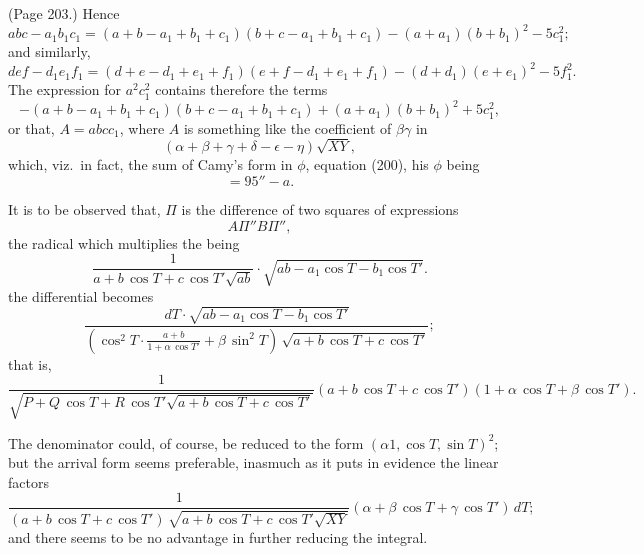 \documentclass[11pt,a4paper]{book}
\begin{document}
\medskip

\noindent (Page 203.) Hence
\[
abc - a_1 b_1 c_1 = (a + b - a_1 + b_1 + c_1) (b + c - a_1 + b_1 + c_1) - (a + a_1) (b + b_1)^2 - 5 c_1^2;
\]
and similarly,
\[
def - d_1 e_1 f_1 = (d + e - d_1 + e_1 + f_1)(e + f - d_1 + e_1 + f_1) - (d + d_1)(e + e_1)^2 - 5 f_1^2.
\]
The expression for $a^2 c_1^2$ contains therefore the terms
\[
- (a + b - a_1 + b_1 + c_1)(b + c - a_1 + b_1 + c_1) + (a + a_1) ( b + b_1)^2 + 5 c_1^2,
\]
or that, $A = a b c c_1$, where $A$ is something like the coefficient of $\beta \gamma$ in
\[
(\alpha + \beta + \gamma + \delta - \epsilon - \eta) \sqrt{X Y},
\]
which, viz.\ in fact, the sum of Camy's form in $\phi$, equation (200), his $\phi$ being
\[
= 95'' - a.
\]

It is to be observed that, $\Pi$ is the difference of two squares of expressions
\[
A \Pi'' B \Pi'',
\]
the radical which multiplies the being
\[
\frac{1}{a + b\, \cos T + c\, \cos T'\sqrt{a b}} \cdot \sqrt{a b - a_1 \cos T - b_1 \cos T'}.
\]
the differential becomes
\[
\frac{d T \cdot \sqrt{a b - a_1 \cos T - b_1 \cos T'}}{(\cos^2 T \cdot \frac{a + b}{1 + \alpha\, \cos T'} + \beta\, \sin^2 T)\,\sqrt{a + b\,\cos T + c\,\cos T'}};
\]
that is,
\[
\frac{1}{\sqrt{P + Q\,\cos T + R\,\cos T'\sqrt{a + b\,\cos T + c\,\cos T'}}} (a + b\,\cos T + c\,\cos T') (1 + \alpha\,\cos T + \beta\,\cos T').
\]

The denominator could, of course, be reduced to the form $(\alpha 1, \cos T, \sin T)^2$; but the arrival form seems preferable, inasmuch as it puts in evidence the linear factors
\[
\frac{1}{(a + b\,\cos T + c\,\cos T')\,\sqrt{a + b\,\cos T + c\,\cos T'\sqrt{X Y}}} (\alpha + \beta\,\cos T + \gamma\,\cos T') \,dT;
\]
and there seems to be no advantage in further reducing the integral.

\medskip
\end{document}
